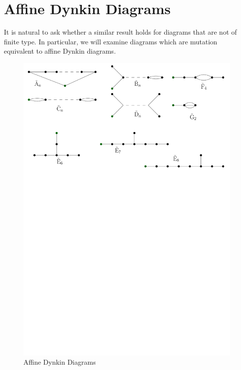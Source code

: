\documentclass{beamer}
\begin{document}
\section{Affine Dynkin Diagrams}
\begin{frame}
It is natural to ask whether a similar result holds for diagrams that are not of finite type. In particular, we will examine diagrams which are mutation equivalent to affine Dynkin diagrams.
\begin{figure}
\includegraphics[scale = .50]{Affine-Diagrams.pdf}
\caption{Affine Dynkin Diagrams}
\end{figure}
\end{frame}
\end{document}
